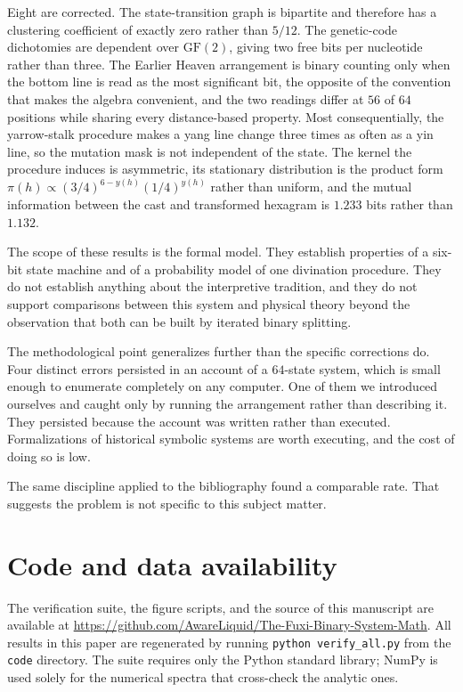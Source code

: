 \documentclass[11pt,a4paper]{article}
\begin{document}
Eight are corrected. The state-transition graph is bipartite and therefore has a
clustering coefficient of exactly zero rather than $5/12$. The genetic-code
dichotomies are dependent over $\mathrm{GF}(2)$, giving two free bits per
nucleotide rather than three. The Earlier Heaven arrangement is binary counting
only when the bottom line is read as the most significant bit, the opposite of
the convention that makes the algebra convenient, and the two readings differ at
$56$ of $64$ positions while sharing every distance-based property. Most
consequentially, the yarrow-stalk procedure
makes a yang line change three times as often as a yin line, so the mutation mask
is not independent of the state. The kernel the procedure induces is asymmetric,
its stationary distribution is the product form
$\pi(h) \propto (3/4)^{6-y(h)}(1/4)^{y(h)}$ rather than uniform, and the mutual
information between the cast and transformed hexagram is $1.233$ bits rather than
$1.132$.

The scope of these results is the formal model. They establish properties of a
six-bit state machine and of a probability model of one divination procedure.
They do not establish anything about the interpretive tradition, and they do not
support comparisons between this system and physical theory beyond the
observation that both can be built by iterated binary splitting.

The methodological point generalizes further than the specific corrections do.
Four distinct errors persisted in an account of a $64$-state system, which is
small enough to enumerate completely on any computer. One of them we introduced
ourselves and caught only by running the arrangement rather than describing it.
They persisted because the account was written rather than executed.
Formalizations of historical symbolic systems are worth executing, and the cost
of doing so is low.

The same discipline applied to the bibliography found a comparable rate. That
suggests the problem is not specific to this subject matter.

\section*{Code and data availability}

The verification suite, the figure scripts, and the source of this manuscript are
available at \url{https://github.com/AwareLiquid/The-Fuxi-Binary-System-Math}. All
results in this paper are regenerated by running \texttt{python verify\_all.py}
from the \texttt{code} directory. The suite requires only the Python standard
library; NumPy is used solely for the numerical spectra that cross-check the
analytic ones.
\end{document}

